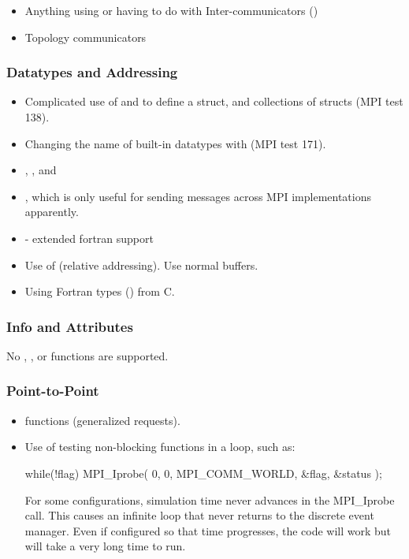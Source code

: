 \begin{itemize}
\item Anything using or having to do with Inter-communicators ()
\item Topology communicators
\end{itemize}

\subsubsection{Datatypes and Addressing}
\label{subsubsec:issues:mpi:types}

\begin{itemize}
\item Complicated use of  and  to define a struct, and collections of structs (MPI test 138). 
\item Changing the name of built-in datatypes with  (MPI test 171).
\item {}, , and 
\item {}, which is only useful for sending messages across MPI implementations apparently.
\item {}  - extended fortran support
\item Use of  (relative addressing).  Use normal buffers. 
\item Using Fortran types (\eg {}) from C.
\end{itemize}


\subsubsection{Info and Attributes}
\label{subsubsec:issues:mpi:info}

No , , or  functions are supported.

\subsubsection{Point-to-Point}
\label{subsubsec:issues:mpi:ptpt}

\begin{itemize}
\item {} functions (generalized requests).
\item Use of testing non-blocking functions in a loop, such as:


\begin{CppCode}
while(!flag)
{
  MPI_Iprobe( 0, 0, MPI_COMM_WORLD, &flag, &status );
}
\end{CppCode}

For some configurations, simulation time never advances in the MPI\_Iprobe call. 
This causes an infinite loop that never returns to the discrete event manager. 
Even if configured so that time progresses, the code will work but will take a very long time to run.
	
\end{itemize}


